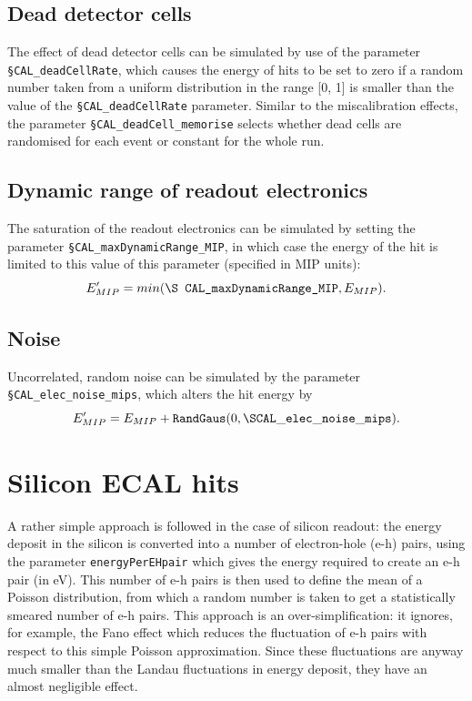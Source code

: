 \documentclass[12pt]{article} %
\begin{document}
\subsection{Dead detector cells}
The effect of dead detector cells can be simulated by use of the parameter {\tt \S CAL\_deadCellRate}, which causes the energy
of hits to be set to zero if a random number taken from a uniform distribution in the range [0, 1] is smaller than the 
value of the {\tt \S CAL\_deadCellRate} parameter.
Similar to the miscalibration effects, the parameter {\tt \S CAL\_deadCell\_memorise} selects whether dead cells are randomised for each event or constant for the whole run.

\subsection{Dynamic range of readout electronics}
The saturation of the readout electronics can be simulated by setting the parameter {\tt \S CAL\_maxDynamicRange\_MIP},
in which case the energy of the hit is limited to this value of this parameter (specified in MIP units):
\begin{equation*}
E'_{MIP} = min ( \text{\tt \S CAL\_maxDynamicRange\_MIP}, E_{MIP} ).
\end{equation*}

\subsection{Noise}
Uncorrelated, random noise can be simulated by the parameter {\tt \S CAL\_elec\_noise\_mips}, which
alters the hit energy by
\begin{equation*}
E'_{MIP} = E_{MIP} + \text{\tt RandGaus} ( 0, {\tt \S CAL\_elec\_noise\_mips} ).
\end{equation*}

\section{Silicon ECAL hits}

A rather simple approach is followed in the case of silicon readout: 
the energy deposit in the silicon is converted into a number of electron-hole (e-h) pairs,
using the parameter {\tt energyPerEHpair} which gives the energy required to create an e-h pair (in eV).
This number of e-h pairs is then used to define the mean of a Poisson distribution, from which a random number is taken 
to get a statistically smeared number of e-h pairs. 
This approach is an over-simplification: it ignores, for example, the Fano
effect which reduces the fluctuation of e-h pairs with respect to this simple Poisson approximation.
Since these fluctuations are anyway much smaller than the Landau fluctuations in energy deposit, 
they have an almost negligible effect.
\end{document}
